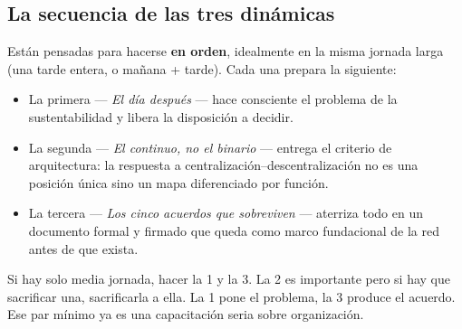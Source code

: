\documentclass[11pt, a4paper]{article}
\begin{document}
\subsection*{La secuencia de las tres dinámicas}

Están pensadas para hacerse \textbf{en orden}, idealmente en la misma jornada larga (una tarde entera, o mañana + tarde). Cada una prepara la siguiente:

\begin{itemize}
  \item La primera --- \emph{El día después} --- hace consciente el problema de la sustentabilidad y libera la disposición a decidir.
  \item La segunda --- \emph{El continuo, no el binario} --- entrega el criterio de arquitectura: la respuesta a centralización--descentralización no es una posición única sino un mapa diferenciado por función.
  \item La tercera --- \emph{Los cinco acuerdos que sobreviven} --- aterriza todo en un documento formal y firmado que queda como marco fundacional de la red antes de que exista.
\end{itemize}

Si hay solo media jornada, hacer la 1 y la 3. La 2 es importante pero si hay que sacrificar una, sacrificarla a ella. La 1 pone el problema, la 3 produce el acuerdo. Ese par mínimo ya es una capacitación seria sobre organización.

\vspace{1.5em}
\end{document}
